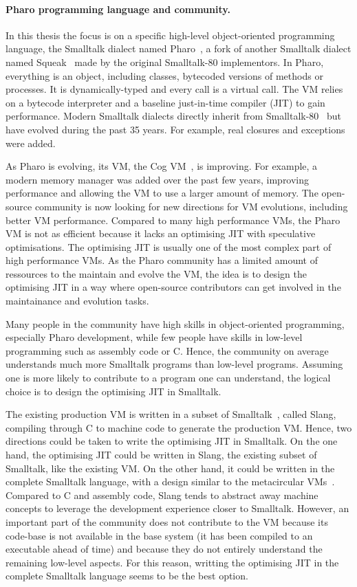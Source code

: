 \documentclass[a4paper,12pt,twoside]{../includes/ThesisStyle}
\begin{document}
\paragraph{Pharo programming language and community.}

In this thesis the focus is on a specific high-level object-oriented programming language, the Smalltalk dialect named Pharo~\cite{Blac09a}, a fork of another Smalltalk dialect named Squeak~\cite{Blac07a} made by the original Smalltalk-80 implementors. In Pharo, everything is an object, including classes, bytecoded versions of methods or processes. It is dynamically-typed and every call is a virtual call. The VM relies on a bytecode interpreter and a baseline just-in-time compiler (JIT) to gain performance. Modern Smalltalk dialects directly inherit from Smalltalk-80~\cite{Gold83a} but have evolved during the past 35 years. For example, real closures and exceptions were added.

As Pharo is evolving, its VM, the Cog VM~\cite{Mira08a}, is improving. For example, a modern memory manager was added over the past few years, improving performance and allowing the VM to use a larger amount of memory. The open-source community is now looking for new directions for VM evolutions, including better VM performance. Compared to many high performance VMs, the Pharo VM is not as efficient because it lacks an optimising JIT with speculative optimisations. The optimising JIT is usually one of the most complex part of high performance VMs. As the Pharo community has a limited amount of ressources to the maintain and evolve the VM, the idea is to design the optimising JIT in a way where open-source contributors can get involved in the maintainance and evolution tasks.

Many people in the community have high skills in object-oriented programming, especially Pharo development, while few people have skills in low-level programming such as assembly code or C. Hence, the community on average understands much more Smalltalk programs than low-level programs. Assuming one is more likely to contribute to a program one can understand, the logical choice is to design the optimising JIT in Smalltalk.

The existing production VM is written in a subset of Smalltalk~\cite{Inga97a}, called Slang, compiling through C to machine code to generate the production VM. Hence, two directions could be taken to write the optimising JIT in Smalltalk. On the one hand, the optimising JIT could be written in Slang, the existing subset of Smalltalk, like the existing VM. On the other hand, it could be written in the complete Smalltalk language, with a design similar to the metacircular VMs~\cite{Unga05b,Wimm13a,Alp99a}. Compared to C and assembly code, Slang tends to abstract away machine concepts to leverage the development experience closer to Smalltalk. However, an important part of the community does not contribute to the VM because its code-base is not available in the base system (it has been compiled to an executable ahead of time) and because they do not entirely understand the remaining low-level aspects. For this reason, writting the optimising JIT in the complete Smalltalk language seems to be the best option.
\end{document}
